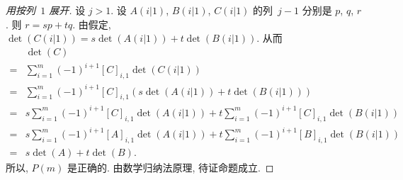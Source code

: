 \begin{proof}[用按列~\(1\) 展开]
    设 \(j > 1\).
    设 \(A(i|1)\), \(B(i|1)\), \(C(i|1)\)
    的列~\(j-1\) 分别是 \(p\), \(q\), \(r\).
    则 \(r = sp + tq\).
    由假定,
    \(\det {(C(i|1))} = s\det {(A(i|1))} + t\det {(B(i|1))}\).
    从而
    \begin{align*}
             & \det {(C)}
        \\
        = {} &
        \sum_{i = 1}^{m}
        {(-1)^{i+1} [C]_{i,1} \det {(C(i|1))}}
        \\
        = {} &
        \sum_{i = 1}^{m}
        {(-1)^{i+1} [C]_{i,1}
        (s\det {(A(i|1))} + t\det {(B(i|1))})}
        \\
        = {} &
        s \sum_{i = 1}^{m}
        {(-1)^{i+1} [C]_{i,1} \det {(A(i|1))}}
        +
        t \sum_{i = 1}^{m}
        {(-1)^{i+1} [C]_{i,1} \det {(B(i|1))}}
        \\
        = {} &
        s \sum_{i = 1}^{m}
        {(-1)^{i+1} [A]_{i,1} \det {(A(i|1))}}
        +
        t \sum_{i = 1}^{m}
        {(-1)^{i+1} [B]_{i,1} \det {(B(i|1))}}
        \\
        = {} &
        s \det {(A)} + t \det {(B)}.
    \end{align*}
    所以, \(P(m)\) 是正确的.
    由数学归纳法原理, 待证命题成立.
\end{proof}

